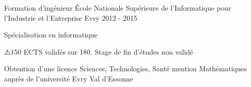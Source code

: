 
\begin{cventries}



\cventry
{Formation d'ingénieur}
{\'Ecole Nationale Supérieure de l'Informatique pour l'Industrie et l'Entreprise}
{Evry}
{2012 - 2015}
{
	\begin{cvitems}
	\item{Spécialisation en informatique}
	\item{⚠️150 ECTS validés sur 180. Stage de fin d'études non validé}
	\item{Obtention d'une licence Sciences, Technologies, Santé mention Mathématiques auprès de l'université Evry Val d'Essonne}
	\end{cvitems}
}


\end{cventries}